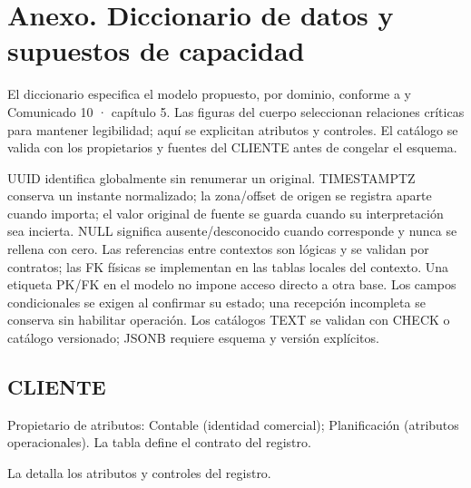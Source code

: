 \section*{Anexo. Diccionario de datos y supuestos de capacidad}\label{sec:05-anexo-diccionario}
El diccionario especifica el modelo propuesto, por dominio, conforme a  y Comunicado 10 · capítulo 5. Las figuras del cuerpo seleccionan relaciones críticas para mantener legibilidad; aquí se explicitan atributos y controles. El catálogo se valida con los propietarios y fuentes del CLIENTE antes de congelar el esquema.

UUID identifica globalmente sin renumerar un original. TIMESTAMPTZ conserva un instante normalizado; la zona/offset de origen se registra aparte cuando importa; el valor original de fuente se guarda cuando su interpretación sea incierta. NULL significa ausente/desconocido cuando corresponde y nunca se rellena con cero. Las referencias entre contextos son lógicas y se validan por contratos; las FK físicas se implementan en las tablas locales del contexto. Una etiqueta PK/FK en el modelo no impone acceso directo a otra base. Los campos condicionales se exigen al confirmar su estado; una recepción incompleta se conserva sin habilitar operación. Los catálogos TEXT se validan con CHECK o catálogo versionado; JSONB requiere esquema y versión explícitos.

\subsection*{CLIENTE}\label{sec:05-anexo-cliente}

Propietario de atributos: Contable (identidad comercial); Planificación (atributos operacionales). La tabla define el contrato del registro.

La  detalla los atributos y controles del registro.

